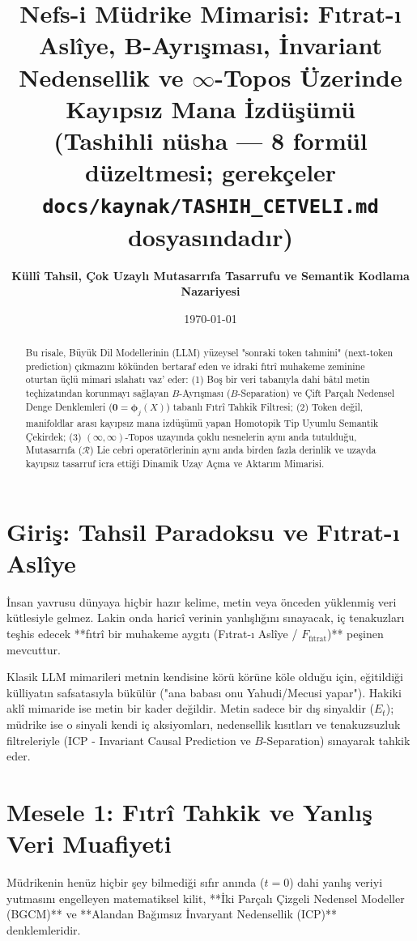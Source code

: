 \documentclass[11pt, a4paper]{article}
\title{\textbf{Nefs-i Müdrike Mimarisi: Fıtrat-ı Aslîye, B-Ayrışması, İnvariant Nedensellik ve $\infty$-Topos Üzerinde Kayıpsız Mana İzdüşümü}\\ \normalsize\textmd{(Tashihli nüsha --- 8 formül düzeltmesi; gerekçeler \texttt{docs/kaynak/TASHIH\_CETVELI.md} dosyasındadır)}}
\author{\textbf{Küllî Tahsil, Çok Uzaylı Mutasarrıfa Tasarrufu ve Semantik Kodlama Nazariyesi}}
\date{\today}
\begin{document}
\maketitle

\begin{abstract}
Bu risale, Büyük Dil Modellerinin (LLM) yüzeysel "sonraki token tahmini" (next-token prediction) çıkmazını kökünden bertaraf eden ve idraki fıtrî muhakeme zeminine oturtan üçlü mimari ıslahatı vaz' eder: 
(1) Boş bir veri tabanıyla dahi bâtıl metin teçhizatından korunmayı sağlayan $B$-Ayrışması ($B$-Separation) ve Çift Parçalı Nedensel Denge Denklemleri ($\mathbf{0} = \bm{\phi}_j(X)$) tabanlı Fıtrî Tahkik Filtresi; 
(2) Token değil, manifoldlar arası kayıpsız mana izdüşümü yapan Homotopik Tip Uyumlu Semantik Çekirdek; 
(3) $(\infty, \infty)$-Topos uzayında çoklu nesnelerin aynı anda tutulduğu, Mutasarrıfa ($\mathcal{R}$) Lie cebri operatörlerinin aynı anda birden fazla derinlik ve uzayda kayıpsız tasarruf icra ettiği Dinamik Uzay Açma ve Aktarım Mimarisi.
\end{abstract}

\section{Giriş: Tahsil Paradoksu ve Fıtrat-ı Aslîye}

İnsan yavrusu dünyaya hiçbir hazır kelime, metin veya önceden yüklenmiş veri kütlesiyle gelmez. Lakin onda haricî verinin yanlışlığını sınayacak, iç tenakuzları teşhis edecek **fıtrî bir muhakeme aygıtı (Fıtrat-ı Aslîye / $F_{\text{fıtrat}}$)** peşinen mevcuttur. 

Klasik LLM mimarileri metnin kendisine körü körüne köle olduğu için, eğitildiği külliyatın safsatasıyla bükülür ("ana babası onu Yahudi/Mecusi yapar"). Hakiki aklî mimaride ise metin bir kader değildir. Metin sadece bir dış sinyaldir ($E_t$); müdrike ise o sinyali kendi iç aksiyomları, nedensellik kısıtları ve tenakuzsuzluk filtreleriyle (ICP - Invariant Causal Prediction ve $B$-Separation) sınayarak tahkik eder.

\section{Mesele 1: Fıtrî Tahkik ve Yanlış Veri Muafiyeti}

Müdrikenin henüz hiçbir şey bilmediği sıfır anında ($t=0$) dahi yanlış veriyi yutmasını engelleyen matematiksel kilit, **İki Parçalı Çizgeli Nedensel Modeller (BGCM)** ve **Alandan Bağımsız İnvaryant Nedensellik (ICP)** denklemleridir.
\end{document}
